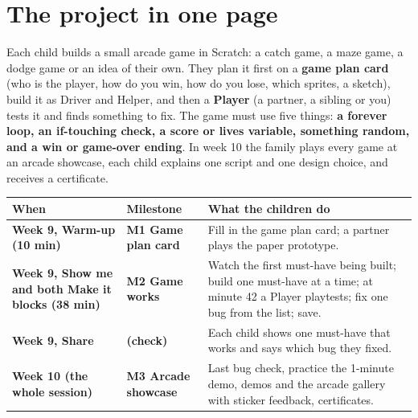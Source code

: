 \documentclass[track=junior,level=2,teacher]{kidscode}
\begin{document}
\tableofcontents

\section{The project in one page}
Each child builds a small arcade game in Scratch: a catch game, a maze game, a dodge game or an
idea of their own. They plan it first on a \textbf{game plan card} (who is the player, how do you
win, how do you lose, which sprites, a sketch), build it as Driver and Helper, and then a
\textbf{Player} (a partner, a sibling or you) tests it and finds something to fix. The game must use
five things: \textbf{a forever loop, an if-touching check, a score or lives variable, something
random, and a win or game-over ending}. In week 10 the family plays every game at an arcade
showcase, each child explains one script and one design choice, and receives a certificate.

\begin{center}\small\renewcommand{\arraystretch}{1.35}
\begin{tabularx}{\linewidth}{@{}>{\bfseries\RaggedRight}p{3.0cm}>{\bfseries\RaggedRight}p{3.0cm}X@{}}
\toprule
When & Milestone & What the children do\\
\midrule
Week 9, Warm-up (10 min) & M1 Game plan card & Fill in the game plan card; a partner plays the paper prototype.\\
Week 9, Show me and both Make it blocks (38 min) & M2 Game works & Watch the first must-have being built; build one must-have at a time; at minute 42 a Player playtests; fix one bug from the list; save.\\
Week 9, Share & (check) & Each child shows one must-have that works and says which bug they fixed.\\
Week 10 (the whole session) & M3 Arcade showcase & Last bug check, practice the 1-minute demo, demos and the arcade gallery with sticker feedback, certificates.\\
\bottomrule
\end{tabularx}
\end{center}
\end{document}
